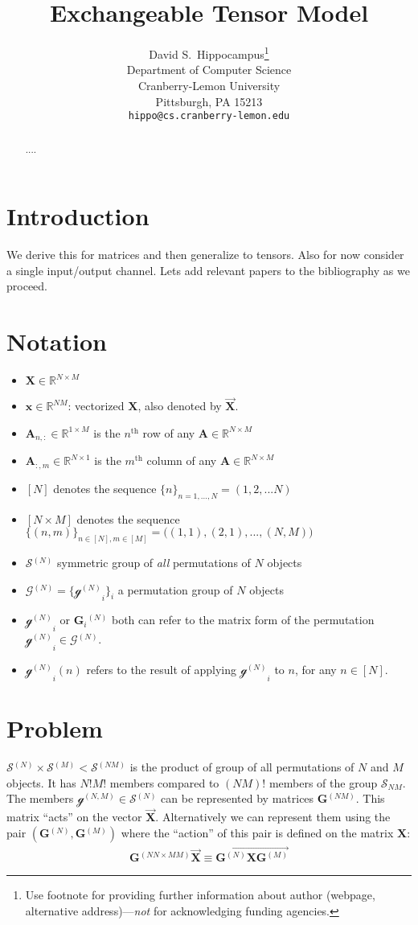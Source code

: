 \documentclass{article}
\title{Exchangeable Tensor Model}
\author{
  David S.~Hippocampus\thanks{Use footnote for providing further
    information about author (webpage, alternative
    address)---\emph{not} for acknowledging funding agencies.} \\
  Department of Computer Science\\
  Cranberry-Lemon University\\
  Pittsburgh, PA 15213 \\
  \texttt{hippo@cs.cranberry-lemon.edu} \\
}
\newcommand{\mat}[1]{\ensuremath{\mathbf{#1}}}
\newcommand{\gr}[1]{\ensuremath{\mathcal{#1}}}
\newcommand{\set}[1]{\ensuremath{\mathbb{#1}}}
\renewcommand{\vec}[1]{\ensuremath{\overrightarrow{#1}}}
\newcommand{\prm}[1]{\ensuremath{^{(#1)}}}
\newcommand{\grn}[2]{\ensuremath{\gr{#1}\prm{#2}}}
\newcommand{\A}[0]{\ensuremath{\mat{A}}}
\newcommand{\XX}[0]{\ensuremath{\mat{X}}}
\newcommand{\xx}[0]{\ensuremath{\mat{x}}}
\renewcommand{\Re}[0]{\ensuremath{\set{R}}}
\theoremstyle{definition}
\begin{document}

\maketitle

\begin{abstract}
....
\end{abstract}
\section{Introduction}
We derive this for matrices and then generalize to tensors.
Also for now consider a single input/output channel.
Lets add relevant papers to the bibliography as we proceed.

\section{Notation}
\begin{itemize}
\item $\XX \in \Re^{N \times M}$
\item $\xx \in \Re^{N M}$: vectorized $\XX$, also denoted by $\vec{\XX}$.
\item $\A_{n,:} \in \Re^{1 \times M}$ is the $n^\text{th}$ row of any $\A \in \Re^{N \times M}$
\item $\A_{:,m} \in \Re^{N \times 1}$ is the $m^\text{th}$ column of any $\A \in \Re^{N \times M}$
\item $[N]$ denotes the sequence $\{n\}_{n=1,...,N} = (1, 2, ... N)$
\item $[N \times M]$ denotes the sequence $\{(n, m)\}_{n \in [N], m \in [M]} = \big((1,1), (2,1),..., (N, M)\big)$
\item $\grn{S}{N}$ symmetric group of \textit{all} permutations of $N$ objects
\item $\grn{G}{N} = \{\grn{g}{N}_i\}_i$ a permutation group of $N$ objects 
\item $\grn{g}{N}_i$ or $\mat{G}_i\prm{N}$ both can refer to the matrix form of the permutation $\grn{g}{N}_i \in \grn{G}{N}$.
\item $\grn{g}{N}_i(n)$ refers to the result of applying $\grn{g}{N}_i$ to $n$, for any $n \in [N]$.
\end{itemize}

\section{Problem}
$\grn{S}{N} \times \grn{S}{M} < \grn{S}{N M}$ is the product of group of all permutations of $N$ and $M$ objects. It has $N! M!$ members compared to $(NM)!$ members of the group $\gr{S}_{N M}$.
The members $\grn{g}{N,M} \in \grn{S}{N}$ can be represented by matrices $\mat{G}\prm{N M}$. This matrix ``acts'' on the vector $\vec{\XX}$.
Alternatively we can represent them using the pair $(\mat{G}\prm{N}, \mat{G}\prm{M})$ where the ``action'' of this pair is defined on the matrix $\XX$:
\begin{align*}
  \mat{G}\prm{N N \times M M} \vec{\XX} \equiv \vec{\mat{G}\prm{N} \XX \mat{G}\prm{M}}
\end{align*}
\end{document}
